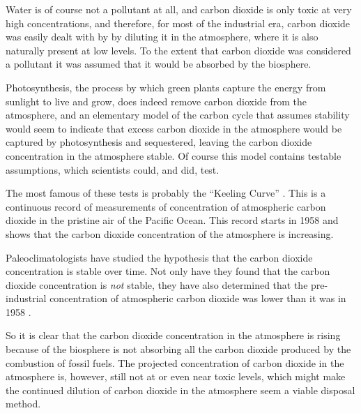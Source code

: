 Water is of course not a pollutant at all, and carbon dioxide is only toxic at
very high concentrations, and therefore, for most of the industrial era, carbon
dioxide was easily dealt with by by diluting it in the atmosphere, where it is
also naturally present at low levels. To the extent that carbon dioxide was
considered a pollutant it was assumed that it would be absorbed by the
biosphere.

Photosynthesis, the process by which green plants capture the energy from
sunlight to live and grow, does indeed remove carbon dioxide from the
atmosphere, and an elementary model of the carbon cycle that assumes stability
would seem to indicate that excess carbon dioxide in the atmosphere would be
captured by photosynthesis and sequestered, leaving the carbon dioxide
concentration in the atmosphere stable. Of course this model contains
testable assumptions, which scientists could, and did, test.

The most famous of these tests is probably the ``Keeling Curve''
\autocite{Harris2010}. This is a continuous record of measurements of
concentration of atmospheric carbon dioxide in the pristine air of the Pacific
Ocean. This record starts in 1958 and shows that the carbon dioxide
concentration of the atmosphere is increasing.

Paleoclimatologists have studied the hypothesis that the carbon dioxide
concentration is stable over time. Not only have they found that the carbon
dioxide concentration is \emph{not} stable, they have also determined that the
pre-industrial concentration of atmospheric carbon dioxide was lower than it was
in 1958 \autocite{Petit1999}.

So it is clear that the carbon dioxide concentration in the atmosphere is rising
because of the biosphere is not absorbing all the carbon dioxide produced by the
combustion of fossil fuels. The projected concentration of carbon dioxide in the
atmosphere is, however, still not at or even near toxic levels, which might make
the continued dilution of carbon dioxide in the atmosphere seem a viable
disposal method.

